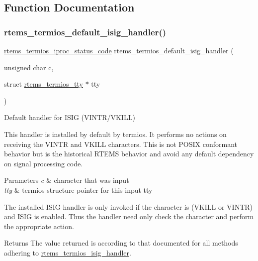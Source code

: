 \subsection{Function Documentation}
\mbox{\label{group__Termios_ga31143aa30ff2944008dfe4e77fb2bbf6}} 
\subsubsection{\texorpdfstring{rtems\_termios\_default\_isig\_handler()}{rtems\_termios\_default\_isig\_handler()}}
{\footnotesize\ttfamily \mbox{\hyperlink{group__Termios_ga8d00143bb99772a960e237f16437fc1b}{rtems\+\_\+termios\+\_\+iproc\+\_\+status\+\_\+code}} rtems\+\_\+termios\+\_\+default\+\_\+isig\+\_\+handler (\begin{DoxyParamCaption}\item[{unsigned char}]{c,  }\item[{struct \mbox{\hyperlink{structrtems__termios__tty}{rtems\+\_\+termios\+\_\+tty}} $\ast$}]{tty }\end{DoxyParamCaption})}



Default handler for I\+S\+IG (V\+I\+N\+T\+R/\+V\+K\+I\+LL) 

This handler is installed by default by termios. It performs no actions on receiving the V\+I\+N\+TR and V\+K\+I\+LL characters. This is not P\+O\+S\+IX conformant behavior but is the historical R\+T\+E\+MS behavior and avoid any default dependency on signal processing code.


\begin{DoxyParams}{Parameters}
{\em c} & character that was input \\
\hline
{\em tty} & termios structure pointer for this input tty\\
\hline
\end{DoxyParams}
The installed I\+S\+IG handler is only invoked if the character is (V\+K\+I\+LL or V\+I\+N\+TR) and I\+S\+IG is enabled. Thus the handler need only check the character and perform the appropriate action.

\begin{DoxyReturn}{Returns}
The value returned is according to that documented for all methods adhering to \mbox{\hyperlink{group__Termios_ga8a2610b7c8bcc2c80bbd040f0e773faf}{rtems\+\_\+termios\+\_\+isig\+\_\+handler}}. 
\end{DoxyReturn}
\mbox{\label{group__Termios_gad4bc0c678b0c08941507b4259815e571}} 

